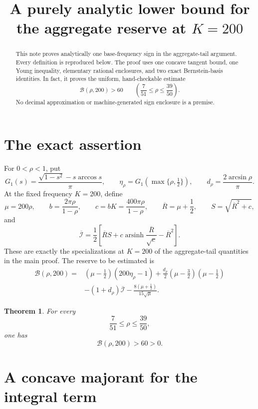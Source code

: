 \documentclass[11pt]{article}
\title{A purely analytic lower bound for the aggregate reserve at \(K=200\)}
\author{}
\date{}
\newtheorem{theorem}{Theorem}
\newcommand{\Ibar}{\overline{\mathcal I}}
\newcommand{\Bcal}{\mathcal B}
\newcommand{\Rbar}{\overline R}
\begin{document}
\maketitle

\begin{abstract}
This note proves analytically one base-frequency sign in the aggregate-tail
argument.  Every definition is reproduced below.  The proof uses one
concave tangent bound, one Young inequality,
elementary rational enclosures, and two exact Bernstein-basis identities.
In fact, it proves the uniform, hand-checkable estimate
\[
 \mathcal B(\rho,200)>60
 \qquad\left(\frac7{51}\leq\rho\leq\frac{39}{50}\right).
\]
No decimal approximation or machine-generated sign enclosure is a premise.
\end{abstract}

\section{The exact assertion}

For \(0<\rho<1\), put
\[
 G_1(s)=\frac{\sqrt{1-s^2}-s\arccos s}{\pi},
 \qquad
 \eta_\rho=G_1\!\left(\max\{\rho,\tfrac12\}\right),
 \qquad
 d_\rho=\frac{2\arcsin\rho}{\pi}.
\]
At the fixed frequency \(K=200\), define
\[
 \mu=200\rho,
 \qquad
 b=\frac{2\pi\rho}{1-\rho},
 \qquad
 c=bK=\frac{400\pi\rho}{1-\rho},
 \qquad
 \Rbar=\mu+\frac12,
 \qquad
 S=\sqrt{\Rbar^2+c},
\]
and
\begin{equation}
 \Ibar
 =\frac12\left[
      \Rbar S+c\operatorname{arsinh}\frac{\Rbar}{\sqrt c}
      -\Rbar^2
    \right].
 \label{eq:I-definition}
\end{equation}
These are exactly the specializations at \(K=200\) of the aggregate-tail
quantities in the main proof.  The reserve to be estimated is
\begin{equation}
\begin{aligned}
 \Bcal(\rho,200)={}&
 (\mu-\tfrac12)(200\eta_\rho-1)
 +\frac{d_\rho}{2}(\mu-\tfrac32)(\mu-\tfrac12)\\
 &-(1+d_\rho)\Ibar
 -\frac{8(\mu+\tfrac12)}{15\sqrt\mu}.
\end{aligned}
\label{eq:B-definition}
\end{equation}

\begin{theorem}
\label{thm:B-positive}
For every
\[
       \frac7{51}\leq\rho\leq\frac{39}{50},
\]
one has
\[
       \Bcal(\rho,200)>60>0.
\]
\end{theorem}

\section{A concave majorant for the integral term}
\end{document}
